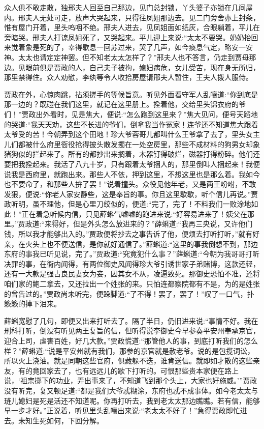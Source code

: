 \begin{parag}
    众人俱不敢走散，独邢夫人回至自己那边，见门总封锁，丫头婆子亦锁在几间屋内。邢夫人无处可走，放声大哭起来，只得往凤姐那边去。见二门旁舍亦上封条，惟有屋门开着，里头呜咽不绝。邢夫人进去，见凤姐面如纸灰，合眼躺着，平儿在旁暗哭。邢夫人打谅凤姐死了，又哭起来。平儿迎上来说:“太太不要哭。奶奶抬回来觉着象是死的了，幸得歇息一回苏过来，哭了几声，如今痰息气定，略安一安神。太太也请定定神罢。但不知老太太怎样了？”邢夫人也不答言，仍走到贾母那边。见眼前俱是贾政的人，自己夫子被拘，媳妇病危，女儿受苦，现在身无所归，那里禁得住。众人劝慰，李纨等令人收拾房屋请邢夫人暂住，王夫人拨人服侍。
\end{parag}


\begin{parag}
    贾政在外，心惊肉跳，拈须搓手的等候旨意。听见外面看守军人乱嚷道:“你到底是那一边的？既碰在我们这里，就记在这里册上。拴着他，交给里头锦衣府的爷们！”贾政出外看时，见是焦大，便说:“怎么跑到这里来？”焦大见问，便号天蹈地的哭道:“我天天劝，这些不长进的爷们，倒拿我当作冤家！连爷还不知道焦大跟着太爷受的苦！今朝弄到这个田地！珍大爷蓉哥儿都叫什么王爷拿了去了，里头女主儿们都被什么府里衙役抢得披头散发擉在一处空房里，那些不成材料的狗男女却象猪狗似的拦起来了。所有的都抄出来搁着，木器钉得破烂，磁器打得粉碎。他们还要把我拴起来。我活了八九十岁，只有跟着太爷捆人的，那里倒叫人捆起来！我便说我是西府里，就跑出来。那些人不依，押到这里，不想这里也是那么着。我如今也不要命了，和那些人拚了罢！”说着撞头。众役见他年老，又是两王吩咐，不敢发狠，便说:“你老人家安静些，这是奉旨的事。你且这里歇歇，听个信儿再说。”贾政听明，虽不理他，但是心里刀绞似的，便道:“完了，完了！不料我们一败涂地如此！”正在着急听候内信，只见薛蝌气嘘嘘的跑进来说:“好容易进来了！姨父在那里。”贾政道:“来得好，但是外头怎么放进来的？”薛蝌道:“我再三央说，又许他们钱，所以我才能够出入的。”贾政便将抄去之事告诉了他，便烦去打听打听，”就有好亲，在火头上也不便送信，是你就好通信了。”薛蝌道:“这里的事我倒想不到，那边东府的事我已听见说，完了。”贾政道:“究竟犯什么事？”薛蝌道:“今朝为我哥哥打听决罪的事，在衙内闻得，有两位御史风闻得珍大爷引诱世家子弟赌博，这款还轻，还有一大款是强占良民妻女为妾，因其女不从，凌逼致死。那御史恐怕不准，还将咱们家的鲍二拿去，又还拉出一个姓张的来。只怕连都察院都有不是，为的是姓张的曾告过的。”贾政尚未听完，便跺脚道:“了不得！罢了，罢了！”叹了一口气，扑簌簌的掉下泪来。
\end{parag}


\begin{parag}
    薛蝌宽慰了几句，即便又出来打听去了。隔了半日，仍旧进来说:“事情不好。我在刑科打听，倒没有听见两王复旨的信，但听得说李御史今早参奏平安州奉承京官，迎合上司，虐害百姓，好几大款。”贾政慌道:“那管他人的事，到底打听我们的怎么样？”薛蝌道:“说是平安州就有我们，那参的京官就是赦老爷。说的是包揽词讼，所以火上浇油。就是同朝这些官府，俱藏躲不迭，谁肯送信。就即如才散的这些亲友，有的竟回家去了，也有远远儿的歇下打听的。可恨那些贵本家便在路上说，‘祖宗掷下的功业，弄出事来了，不知道飞到那个头上，大家也好施威。’”贾政没有听完，复又顿足道:“都是我们大爷忒糊涂，东府也忒不成事体。如今老太太与琏儿媳妇是死是活还不知道呢。你再打听去，我到老太太那边瞧瞧。若有信，能够早一步才好。”正说着，听见里头乱嚷出来说:“老太太不好了！”急得贾政即忙进去。未知生死如何，下回分解。
\end{parag}
